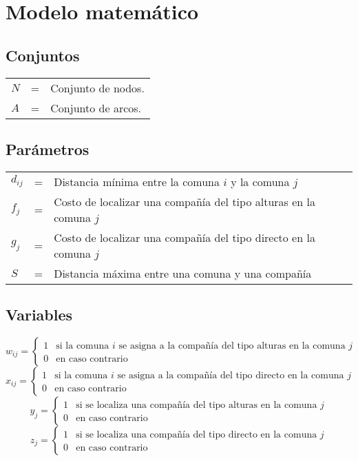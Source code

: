 \documentclass[final]{article}
\numberwithin{equation}{subsection}
\begin{document}
\section{Modelo matemático}
\subsection{Conjuntos}
\begin{tabular}{l r l}
$N$ &=& Conjunto de nodos. \\
$A$ &=& Conjunto de arcos.\\
\end{tabular}

\subsection{Parámetros}
\begin{tabular}{l r l}
$d_{ij}$ &=& Distancia mínima entre la comuna $i$ y la comuna $j$\\
$f_{j}$ &=& Costo de localizar una compañía del tipo alturas en la comuna $j$\\
$g_{j}$ &=& Costo de localizar una compañía del tipo directo en la comuna $j$\\
$S$ &=& Distancia máxima entre una comuna y una compañía\\
\end{tabular}
\subsection{Variables}
\[w_{ij}={\begin{cases}
			1&{\mbox{si la comuna $i$ se asigna a la compañía del tipo alturas en la comuna $j$}}\\
			0&{\mbox{en caso contrario}}\end{cases}}\]
\[x_{ij}={\begin{cases}
			1&{\mbox{si la comuna $i$ se asigna a la compañía del tipo directo en la comuna $j$}}\\
			0&{\mbox{en caso contrario}}\end{cases}}\]
\[y_{j}={\begin{cases}
			1&{\mbox{si se localiza una compañía del tipo alturas en la comuna $j$}}\\
			0&{\mbox{en caso contrario}}\end{cases}}\]
\[z_{j}={\begin{cases}
			1&{\mbox{si se localiza una compañía del tipo directo en la comuna $j$}}\\
			0&{\mbox{en caso contrario}}\end{cases}}\]
\end{document}
